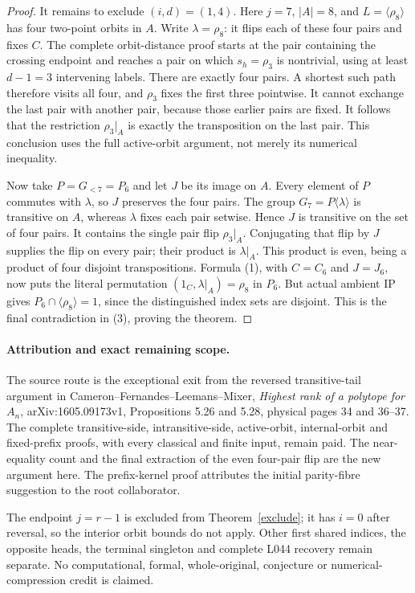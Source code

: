 \documentclass[11pt,a4paper]{article}
\newcommand{\gen}[1]{\langle#1\rangle}
\begin{document}
\begin{proof}
It remains to exclude $(i,d)=(1,4)$. Here $j=7$, $|A|=8$,
and $L=\gen{\rho_8}$ has four two-point orbits in $A$.
Write $\lambda=\rho_8$: it flips each of these four pairs and
fixes $C$. The complete orbit-distance proof starts at the pair
containing the crossing endpoint and reaches a pair on which
$s_h=\rho_3$ is nontrivial, using at least $d-1=3$ intervening
labels. There are exactly four pairs. A shortest such path
therefore visits all four, and $\rho_3$ fixes the first three
pointwise. It cannot exchange the last pair with another pair,
because those earlier pairs are fixed. It follows that the
restriction $\rho_3|_A$ is exactly the transposition on the last
pair. This conclusion uses the full active-orbit argument,
not merely its numerical inequality.

Now take $P=G_{<7}=P_6$ and let $J$ be its image on $A$.
Every element of $P$ commutes with $\lambda$, so $J$ preserves
the four pairs. The group $G_7=P\gen\lambda$ is transitive on
$A$, whereas $\lambda$ fixes each pair setwise. Hence $J$ is
transitive on the set of four pairs. It contains the single
pair flip $\rho_3|_A$. Conjugating that flip by $J$ supplies the
flip on every pair; their product is $\lambda|_A$. This product
is even, being a product of four disjoint transpositions.
Formula (1), with $C=C_6$ and $J=J_6$, now puts the literal
permutation $(1_C,\lambda|_A)=\rho_8$ in $P_6$.
But actual ambient IP gives
$P_6\cap\gen{\rho_8}=1$, since the distinguished index sets are
disjoint. This is the final contradiction in (3), proving
the theorem.
\end{proof}

\paragraph{Attribution and exact remaining scope.}
The source route is the exceptional exit from the reversed
transitive-tail argument in Cameron--Fernandes--Leemans--Mixer,
\emph{Highest rank of a polytope for $A_n$}, arXiv:1605.09173v1,
Propositions 5.26 and 5.28, physical pages 34 and 36--37.
The complete transitive-side, intransitive-side, active-orbit,
internal-orbit and fixed-prefix proofs, with every classical
and finite input, remain paid. The near-equality count and
the final extraction of the even four-pair flip are the new
argument here. The prefix-kernel proof attributes the initial
parity-fibre suggestion to the root collaborator.

The endpoint $j=r-1$ is excluded from Theorem~\ref{exclude};
it has $i=0$ after reversal, so the interior orbit bounds do
not apply. Other first shared indices, the opposite heads,
the terminal singleton and complete L044 recovery remain
separate. No computational, formal, whole-original, conjecture
or numerical-compression credit is claimed.
\end{document}
